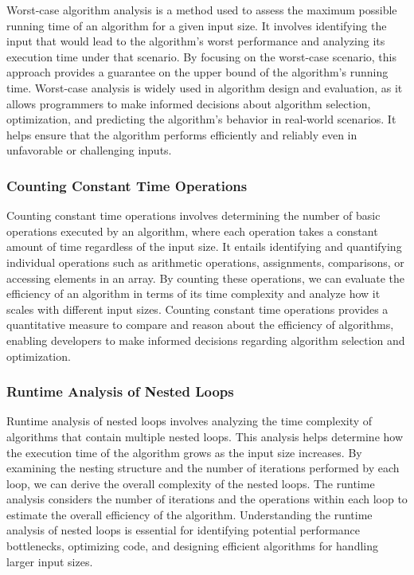 Worst-case algorithm analysis is a method used to assess the maximum possible running time of an algorithm for a given input size. It involves identifying the input that would lead to the algorithm's worst performance and analyzing its execution time under that scenario. By focusing on the worst-case scenario, this approach provides a guarantee on the upper bound of the algorithm's running time. Worst-case analysis is widely used 
in algorithm design and evaluation, as it allows programmers to make informed decisions about algorithm selection, optimization, and predicting the algorithm's behavior in real-world scenarios. It helps ensure that the algorithm performs efficiently and reliably even in unfavorable or challenging inputs.

\subsubsection{Counting Constant Time Operations}

Counting constant time operations involves determining the number of basic operations executed by an algorithm, where each operation takes a constant amount of time regardless of the input size. It entails identifying and quantifying individual operations such as arithmetic operations, assignments, comparisons, or accessing elements in an array. By counting these operations, we can evaluate the efficiency of an algorithm in terms 
of its time complexity and analyze how it scales with different input sizes. Counting constant time operations provides a quantitative measure to compare and reason about the efficiency of algorithms, enabling developers to make informed decisions regarding algorithm selection and optimization.

\subsubsection{Runtime Analysis of Nested Loops}

Runtime analysis of nested loops involves analyzing the time complexity of algorithms that contain multiple nested loops. This analysis helps determine how the execution time of the algorithm grows as the input size increases. By examining the nesting structure and the number of iterations performed by each loop, we can derive the overall complexity of the nested loops. The runtime analysis considers the number of iterations and the 
operations within each loop to estimate the overall efficiency of the algorithm. Understanding the runtime analysis of nested loops is essential for identifying potential performance bottlenecks, optimizing code, and designing efficient algorithms for handling larger input sizes.


